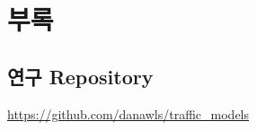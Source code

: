 \documentclass[11pt]{report}
\begin{document}



\newpage



\appendix
\chapter*{부록}
\renewcommand{\thesection}{\Alph{section}}
\section{연구 Repository} 
\bigskip

\url{https://github.com/danawls/traffic_models}



\renewcommand{\indexname}{색인}
\printindex
\bigskip
\end{document}
